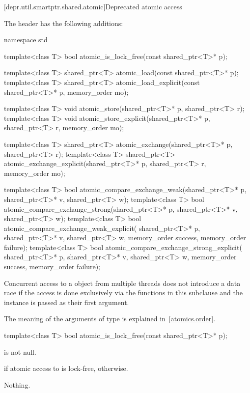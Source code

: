 [depr.util.smartptr.shared.atomic]{Deprecated  atomic access}

\pnum
The header  has the following additions:

%
\begin{codeblock}
namespace std {
  template<class T>
    bool atomic_is_lock_free(const shared_ptr<T>* p);

  template<class T>
    shared_ptr<T> atomic_load(const shared_ptr<T>* p);
  template<class T>
    shared_ptr<T> atomic_load_explicit(const shared_ptr<T>* p, memory_order mo);

  template<class T>
    void atomic_store(shared_ptr<T>* p, shared_ptr<T> r);
  template<class T>
    void atomic_store_explicit(shared_ptr<T>* p, shared_ptr<T> r, memory_order mo);

  template<class T>
    shared_ptr<T> atomic_exchange(shared_ptr<T>* p, shared_ptr<T> r);
  template<class T>
    shared_ptr<T> atomic_exchange_explicit(shared_ptr<T>* p, shared_ptr<T> r, memory_order mo);

  template<class T>
    bool atomic_compare_exchange_weak(shared_ptr<T>* p, shared_ptr<T>* v, shared_ptr<T> w);
  template<class T>
    bool atomic_compare_exchange_strong(shared_ptr<T>* p, shared_ptr<T>* v, shared_ptr<T> w);
  template<class T>
    bool atomic_compare_exchange_weak_explicit(
      shared_ptr<T>* p, shared_ptr<T>* v, shared_ptr<T> w,
      memory_order success, memory_order failure);
  template<class T>
    bool atomic_compare_exchange_strong_explicit(
      shared_ptr<T>* p, shared_ptr<T>* v, shared_ptr<T> w,
      memory_order success, memory_order failure);
}
\end{codeblock}

\pnum
Concurrent access to a  object from multiple threads does not
introduce a data race if the access is done exclusively via the functions in
this subclause and the instance is passed as their first argument.

\pnum
The meaning of the arguments of type  is explained in~\ref{atomics.order}.

%
\begin{itemdecl}
template<class T> bool atomic_is_lock_free(const shared_ptr<T>* p);
\end{itemdecl}

\begin{itemdescr}
\pnum
\expects
{} is not null.

\pnum
\returns
{} if atomic access to  is lock-free,  otherwise.

\pnum
\throws
Nothing.
\end{itemdescr}

